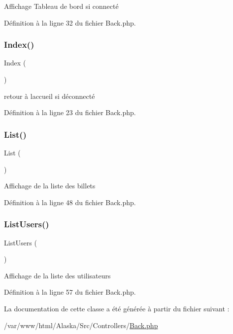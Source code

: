 Affichage Tableau de bord si connecté 

Définition à la ligne 32 du fichier Back.\+php.

\mbox{\label{class_src_1_1_controllers_1_1_back_ac36db983080e1b0934908febca5de2d9}} 
\subsubsection{\texorpdfstring{Index()}{Index()}}
{\footnotesize\ttfamily Index (\begin{DoxyParamCaption}{ }\end{DoxyParamCaption})}

retour à l\textquotesingle{}accueil si déconnecté 

Définition à la ligne 23 du fichier Back.\+php.

\mbox{\label{class_src_1_1_controllers_1_1_back_a17e6c90f14225bdac5c65ed915b0a2f6}} 
\subsubsection{\texorpdfstring{List()}{List()}}
{\footnotesize\ttfamily List (\begin{DoxyParamCaption}{ }\end{DoxyParamCaption})}

Affichage de la liste des billets 

Définition à la ligne 48 du fichier Back.\+php.

\mbox{\label{class_src_1_1_controllers_1_1_back_abfd4f6736a8cd4dc4fa1e012996f4a23}} 
\subsubsection{\texorpdfstring{List\+Users()}{ListUsers()}}
{\footnotesize\ttfamily List\+Users (\begin{DoxyParamCaption}{ }\end{DoxyParamCaption})}

Affichage de la liste des utilisateurs 

Définition à la ligne 57 du fichier Back.\+php.



La documentation de cette classe a été générée à partir du fichier suivant \+:\begin{DoxyCompactItemize}
\item 
/var/www/html/\+Alaska/\+Src/\+Controllers/\hyperlink{_back_8php}{Back.\+php}\end{DoxyCompactItemize}
